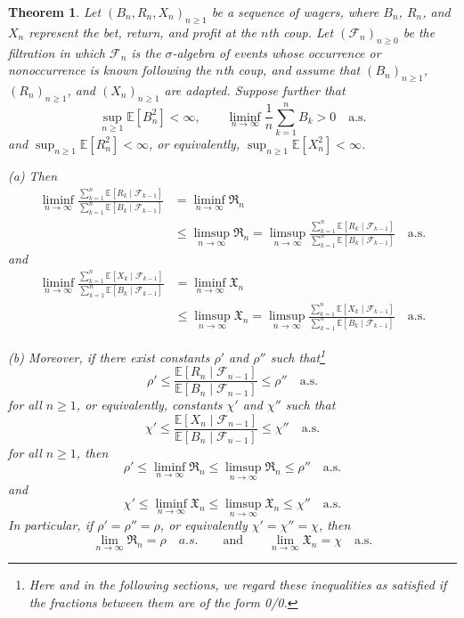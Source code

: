 \documentclass{article}
\newtheorem{theorem}{Theorem}[section]
\theoremstyle{definition}
\theoremstyle{remark}
\newcommand{\E}{\mathbb{E}}
\newcommand{\F}{\mathscr{F}}
\begin{document}
\begin{theorem}\label{theorem:main}
Let $(B_n,R_n,X_n)_{n\ge1}$ be a sequence of wagers, where $B_n$, $R_n$, and $X_n$ represent the bet, return, and profit at the $n$th coup.  Let $(\F_n)_{n\ge 0}$ be the filtration in which $\F_n$ is the $\sigma$-algebra of events whose occurrence or nonoccurrence is known following the $n$th coup, and assume that $(B_n)_{n\ge1}$, $(R_n)_{n\ge1}$, and $(X_n)_{n\ge1}$ are adapted.  Suppose further that
\[
\sup_{n\ge1}\E[B_n^2]< \infty, \qquad
\liminf_{n\to\infty}\frac{1}{n}\sum_{k=1}^n B_k>0\quad\text{a.s.}
\]
and $\sup_{n\ge1}\E[R_n^2]<\infty$, or equivalently, $\sup_{n\ge1}\E[X_n^2]<\infty$.

(a) Then 
\begin{align*}
\liminf_{n\to\infty}\frac{\sum_{k=1}^n \E[R_k\mid\F_{k-1}]}{\sum_{k=1}^n \E[B_k\mid\F_{k-1}]}
&=\liminf_{n\to\infty} \mathfrak{R}_n \\
&\le\limsup_{n\to\infty} \mathfrak{R}_n
=\limsup_{n\to\infty}\frac{\sum_{k=1}^n \E[R_k\mid\F_{k-1}]}{\sum_{k=1}^n \E[B_k\mid\F_{k-1}]}
\quad\text{a.s.}
\end{align*}
and 
\begin{align*}
\liminf_{n\to\infty}\frac{\sum_{k=1}^n \E[X_k\mid\F_{k-1}]}{\sum_{k=1}^n \E[B_k\mid\F_{k-1}]}
&=\liminf_{n\to\infty} \mathfrak{X}_n \\
&\le\limsup_{n\to\infty} \mathfrak{X}_n
=\limsup_{n\to\infty}\frac{\sum_{k=1}^n \E[X_k\mid\F_{k-1}]}{\sum_{k=1}^n \E[B_k\mid\F_{k-1}]}
\quad\text{a.s.}
\end{align*}

(b) Moreover, if there exist constants $\rho'$ and $\rho''$ such that\footnote{\label{note1}Here and in the following sections, we regard these inequalities as satisfied if the fractions between them are of the form 0/0.}
\[
    \rho'
    \le \frac{\E[R_n \mid \F_{n-1}]}{\E[B_n \mid \F_{n-1}]}
    \le \rho'' \quad \text{a.s.}
\]
for all $n\ge1$, or equivalently, constants $\chi'$ and $\chi''$ such that 
\[
    \chi'
    \le \frac{\E[X_n \mid \F_{n-1}]}{\E[B_n \mid \F_{n-1}]}
    \le \chi'' \quad \text{a.s.}
\]
for all $n\ge1$, then
\[    \rho' \le \liminf_{n\to\infty}\mathfrak{R}_n
    \le \limsup_{n\to\infty}\mathfrak{R}_n
    \le \rho''\quad \text{a.s.}
\]
and
\[
    \chi' \le \liminf_{n\to\infty}\mathfrak{X}_n
    \le \limsup_{n\to\infty}\mathfrak{X}_n
    \le \chi''
    \quad \text{a.s.}
\]
In particular, if $\rho'=\rho''=\rho$, or equivalently $\chi'=\chi''=\chi$, then 
\[
\lim_{n\to\infty}\mathfrak{R}_n = \rho\quad a.s.\qquad \text{and} \qquad \lim_{n\to\infty}\mathfrak{X}_n = \chi \quad \text{a.s.}
\]
\end{theorem}
\end{document}
